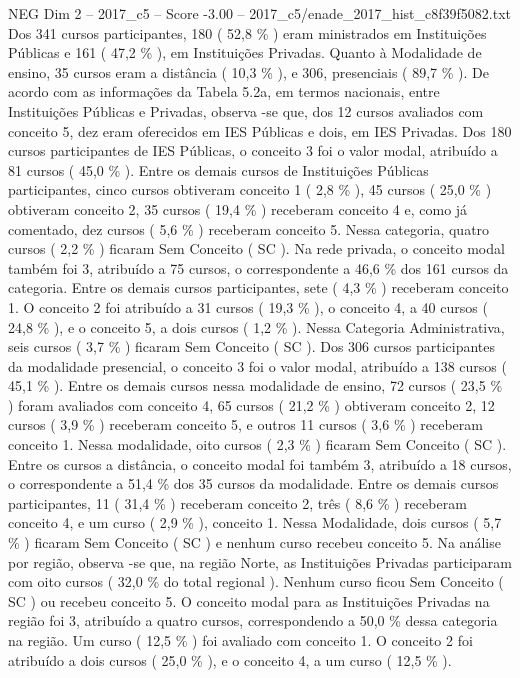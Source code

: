 \begin{textsample}{NEG Dim 2 – 2017\_c5 – Score -3.00 – 2017\_c5/enade\_2017\_hist\_c8f39f5082.txt}
Dos 341 cursos participantes, 180 ( 52,8 \% ) eram ministrados em Instituições Públicas e 161 ( 47,2 \% ), em Instituições Privadas.
Quanto à Modalidade de ensino, 35 cursos eram a distância ( 10,3 \% ), e 306, presenciais ( 89,7 \% ).
De acordo com as informações da Tabela 5.2a, em termos nacionais, entre Instituições Públicas e Privadas, observa -se que, dos 12 cursos avaliados com conceito 5, dez eram oferecidos em IES Públicas e dois, em IES Privadas.
Dos 180 cursos participantes de IES Públicas, o conceito 3 foi o valor modal, atribuído a 81 cursos ( 45,0 \% ).
Entre os demais cursos de Instituições Públicas participantes, cinco cursos obtiveram conceito 1 ( 2,8 \% ), 45 cursos ( 25,0 \% ) obtiveram conceito 2, 35 cursos ( 19,4 \% ) receberam conceito 4 e, como já comentado, dez cursos ( 5,6 \% ) receberam conceito 5.
Nessa categoria, quatro cursos ( 2,2 \% ) ficaram Sem Conceito ( SC ).
Na rede privada, o conceito modal também foi 3, atribuído a 75 cursos, o correspondente a 46,6 \% dos 161 cursos da categoria.
Entre os demais cursos participantes, sete ( 4,3 \% ) receberam conceito 1.
O conceito 2 foi atribuído a 31 cursos ( 19,3 \% ), o conceito 4, a 40 cursos ( 24,8 \% ), e o conceito 5, a dois cursos ( 1,2 \% ).
Nessa Categoria Administrativa, seis cursos ( 3,7 \% ) ficaram Sem Conceito ( SC ).
Dos 306 cursos participantes da modalidade presencial, o conceito 3 foi o valor modal, atribuído a 138 cursos ( 45,1 \% ).
Entre os demais cursos nessa modalidade de ensino, 72 cursos ( 23,5 \% ) foram avaliados com conceito 4, 65 cursos ( 21,2 \% ) obtiveram conceito 2, 12 cursos ( 3,9 \% ) receberam conceito 5, e outros 11 cursos ( 3,6 \% ) receberam conceito 1.
Nessa modalidade, oito cursos ( 2,3 \% ) ficaram Sem Conceito ( SC ).
Entre os cursos a distância, o conceito modal foi também 3, atribuído a 18 cursos, o correspondente a 51,4 \% dos 35 cursos da modalidade.
Entre os demais cursos participantes, 11 ( 31,4 \% ) receberam conceito 2, três ( 8,6 \% ) receberam conceito 4, e um curso ( 2,9 \% ), conceito 1.
Nessa Modalidade, dois cursos ( 5,7 \% ) ficaram Sem Conceito ( SC ) e nenhum curso recebeu conceito 5.
Na análise por região, observa -se que, na região Norte, as Instituições Privadas participaram com oito cursos ( 32,0 \% do total regional ).
Nenhum curso ficou Sem Conceito ( SC ) ou recebeu conceito 5.
O conceito modal para as Instituições Privadas na região foi 3, atribuído a quatro cursos, correspondendo a 50,0 \% dessa categoria na região.
Um curso ( 12,5 \% ) foi avaliado com conceito 1.
O conceito 2 foi atribuído a dois cursos ( 25,0 \% ), e o conceito 4, a um curso ( 12,5 \% ).

\end{textsample}
